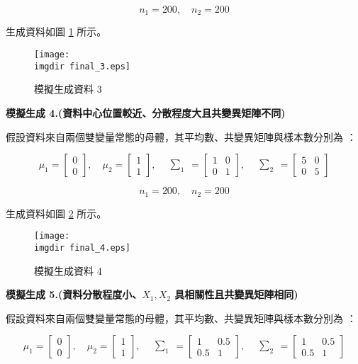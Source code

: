 \[n_1 = 200, \quad n_2 = 200\]

生成資料如圖 \ref{fig:final_3} 所示。
\begin{figure}[H]
    \centering
        \texttt{[image: \\imgdir final\_3.eps]}
    \caption{模擬生成資料 3}
    \label{fig:final_3}
\end{figure}

\textbf{\large 模擬生成 4.(資料中心位置較近、分散程度大且共變異矩陣不同)}

假設資料來自兩個雙變量常態的母體，其平均數、共變異矩陣與樣本數分別為 ：

\[\mu_1 = \begin{bmatrix}
0 \\
0
\end{bmatrix}, \quad \mu_2 = \begin{bmatrix}
1 \\
1
\end{bmatrix}, \quad \begin{matrix} \sum_{1} \end{matrix} = \begin{bmatrix}
1 & 0\\
0 & 1
\end{bmatrix}, \quad \begin{matrix} \sum_{2} \end{matrix} = \begin{bmatrix}
5 & 0\\
0 & 5
\end{bmatrix}\]

\[n_1 = 200, \quad n_2 = 200\]

生成資料如圖 \ref{fig:final_4} 所示。
\begin{figure}[H]
    \centering
        \texttt{[image: \\imgdir final\_4.eps]}
    \caption{模擬生成資料 4}
    \label{fig:final_4}
\end{figure}

\textbf{\large 模擬生成 5.(資料分散程度小、$X_1, X_2$ 具相關性且共變異矩陣相同)}

假設資料來自兩個雙變量常態的母體，其平均數、共變異矩陣與樣本數分別為 ：

\[\mu_1 = \begin{bmatrix}
0 \\
0
\end{bmatrix}, \quad \mu_2 = \begin{bmatrix}
1 \\
1
\end{bmatrix}, \quad \begin{matrix} \sum_{1} \end{matrix} = \begin{bmatrix}
1 & 0.5\\
0.5 & 1
\end{bmatrix}, \quad \begin{matrix} \sum_{2} \end{matrix} = \begin{bmatrix}
1 & 0.5\\
0.5 & 1
\end{bmatrix}\]

